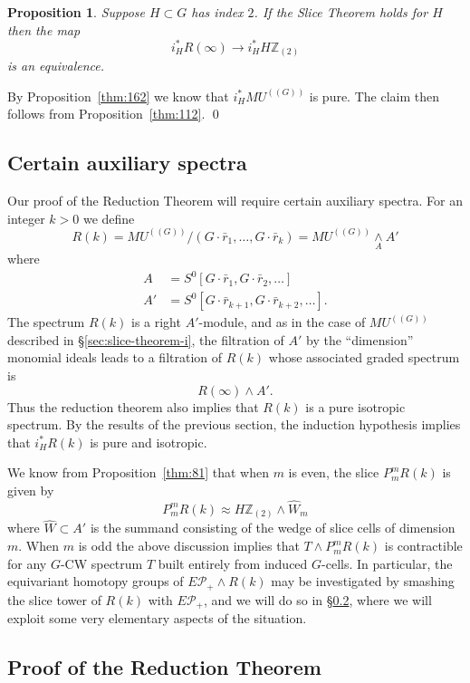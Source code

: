 \documentclass{amsart}
\newtheorem{prop}[equation]{Proposition}
\theoremstyle{definition}
\theoremstyle{remark}
\newenvironment{pf}{\bigskip{\em Proof:\/}}{\qed\medskip}
\newcommand{\Z}{{\mathbb Z}}
\newcommand{\mutn}[1]{MU^{(\!(#1)\!)}}
\newcommand{\slc}[2]{P_{#1}^{#1}#2}
\newcommand{\smashove}[1]{\underset{#1}{\wedge}}
\newcommand{\epfam}{E\pfamily_{+}}
\newcommand{\zlt}{\Z_{(2)}}
\newcommand{\gbar}{\bar}
\newcommand{\rr}{\gbar{r}}
\newcommand{\refine}{\widehat{W}}
\newcommand{\pfamily}{\mathcal P}
\begin{document}
\begin{prop}
\label{thm:170} Suppose $H\subset G$ has index $2$.  If the Slice
Theorem holds for $H$ then the map 
\[
i_{H}^{\ast}R(\infty)\to i_{H}^{\ast}H\zlt
\]
is an equivalence.
\end{prop}

\begin{pf}
By Proposition~\ref{thm:162} we know that $i_{H}^{\ast}\mutn{G}$ is
pure.  The claim then follows from Proposition~\ref{thm:112}.
\end{pf}

\subsection{Certain auxiliary spectra}
\label{sec:cert-auxil-spectra}

Our proof of the Reduction Theorem will require certain 
auxiliary spectra.    For an integer $k>0$ we define 
\[
R(k) = \mutn{G}/(G\cdot\rr_{1},\dots, G\cdot\rr_{k}) =
\mutn{G}\smashove{A} A'
\]
where 
\begin{align*}
A &=S^{0}[G\cdot\rr_{1},G\cdot\rr_{2},\dots] \\
A' &=S^{0}[G\cdot\rr_{k+1},G\cdot\rr_{k+2},\dots].
\end{align*}
The spectrum $R(k)$ is a right $A'$-module, and as in the case of
$\mutn{G}$ described in \S\ref{sec:slice-theorem-i}, the filtration of
$A'$ by the ``dimension'' monomial ideals leads to a filtration of
$R(k)$ whose associated graded spectrum is
\[
R(\infty)\wedge A'.
\]
Thus the reduction theorem also implies that $R(k)$ is a pure
isotropic spectrum.  By the results of the previous section, the
induction hypothesis implies that $i_{H}^{\ast}R(k)$ is pure and
isotropic.

We know from Proposition~\ref{thm:81} that when $m$ is even, the slice
$\slc{m}{R(k)}$ is given by
\[
\slc{m}{R(k)} \approx H\zlt\wedge \refine_{m} 
\]
where $\refine\subset A'$ is the summand consisting of the wedge of
slice cells of dimension $m$.  When $m$ is odd the above discussion
implies that $T\wedge \slc{m}{R(k)}$ is contractible for any $G$-CW
spectrum $T$ built entirely from induced $G$-cells.  In particular, the
equivariant homotopy groups of $\epfam\wedge R(k)$ may be investigated
by smashing the slice tower of $R(k)$ with $\epfam$, and we will do so
in \S\ref{sec:proof-theor-refthm:21}, where we will exploit some very
elementary aspects of the situation.

\subsection{Proof of the Reduction Theorem}
\label{sec:proof-theor-refthm:21}
\end{document}
